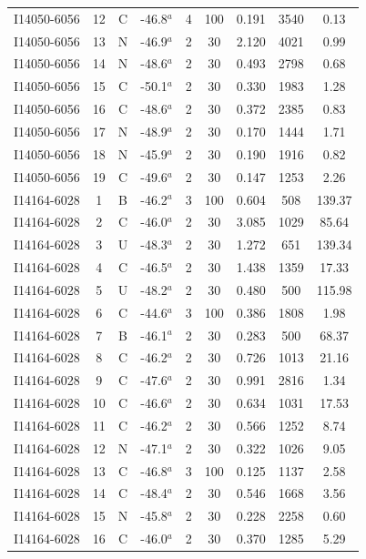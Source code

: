 \begin{table}
\begin{tabular}{ccccccccc}
I14050-6056 & 12 & C & -46.8$^{a}$ & 4 & 100 & 0.191 & 3540 & 0.13 \\
I14050-6056 & 13 & N & -46.9$^{a}$ & 2 & 30 & 2.120 & 4021 & 0.99 \\
I14050-6056 & 14 & N & -48.6$^{a}$ & 2 & 30 & 0.493 & 2798 & 0.68 \\
I14050-6056 & 15 & C & -50.1$^{a}$ & 2 & 30 & 0.330 & 1983 & 1.28 \\
I14050-6056 & 16 & C & -48.6$^{a}$ & 2 & 30 & 0.372 & 2385 & 0.83 \\
I14050-6056 & 17 & N & -48.9$^{a}$ & 2 & 30 & 0.170 & 1444 & 1.71 \\
I14050-6056 & 18 & N & -45.9$^{a}$ & 2 & 30 & 0.190 & 1916 & 0.82 \\
I14050-6056 & 19 & C & -49.6$^{a}$ & 2 & 30 & 0.147 & 1253 & 2.26 \\
I14164-6028 & 1 & B & -46.2$^{a}$ & 3 & 100 & 0.604 & 508 & 139.37 \\
I14164-6028 & 2 & C & -46.0$^{a}$ & 2 & 30 & 3.085 & 1029 & 85.64 \\
I14164-6028 & 3 & U & -48.3$^{a}$ & 2 & 30 & 1.272 & 651 & 139.34 \\
I14164-6028 & 4 & C & -46.5$^{a}$ & 2 & 30 & 1.438 & 1359 & 17.33 \\
I14164-6028 & 5 & U & -48.2$^{a}$ & 2 & 30 & 0.480 & 500 & 115.98 \\
I14164-6028 & 6 & C & -44.6$^{a}$ & 3 & 100 & 0.386 & 1808 & 1.98 \\
I14164-6028 & 7 & B & -46.1$^{a}$ & 2 & 30 & 0.283 & 500 & 68.37 \\
I14164-6028 & 8 & C & -46.2$^{a}$ & 2 & 30 & 0.726 & 1013 & 21.16 \\
I14164-6028 & 9 & C & -47.6$^{a}$ & 2 & 30 & 0.991 & 2816 & 1.34 \\
I14164-6028 & 10 & C & -46.6$^{a}$ & 2 & 30 & 0.634 & 1031 & 17.53 \\
I14164-6028 & 11 & C & -46.2$^{a}$ & 2 & 30 & 0.566 & 1252 & 8.74 \\
I14164-6028 & 12 & N & -47.1$^{a}$ & 2 & 30 & 0.322 & 1026 & 9.05 \\
I14164-6028 & 13 & C & -46.8$^{a}$ & 3 & 100 & 0.125 & 1137 & 2.58 \\
I14164-6028 & 14 & C & -48.4$^{a}$ & 2 & 30 & 0.546 & 1668 & 3.56 \\
I14164-6028 & 15 & N & -45.8$^{a}$ & 2 & 30 & 0.228 & 2258 & 0.60 \\
I14164-6028 & 16 & C & -46.0$^{a}$ & 2 & 30 & 0.370 & 1285 & 5.29 \\

\end{tabular}
\end{table}
